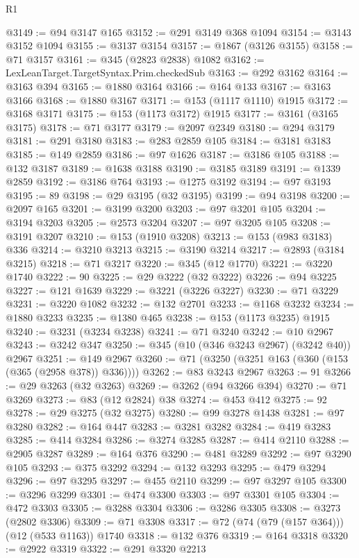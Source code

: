 \begin{lexlean}{R1}
\begin{coremodule}
{{{{{{{{{{{{{{{{{{{{{{{{{{{{{{{{{{{{{{{{{{{{{{{{{{{{{{{{{{{{{{{{{{{{{{{{{{{{{{{{{{{{{{{{{{{{{{{{{{{{{{{{{{{{{{{{{{{{{{{{{{{{{{{{{{{{{{{{{{{{{{{{{{{{{{{{{{{{{{{{{{{{{{{{{{{{{{{{{{{{{{{{{{@3149 := @94 @3147 @165
@3152 := @291 @3149 @368 @1094
@3154 := @3143 @3152 @1094
@3155 := @3137 @3154
@3157 := @1867 (@3126 @3155)
@3158 := @71 @3157
@3161 := @345 (@2823 @2838) @1082
@3162 := LexLeanTarget.TargetSyntax.Prim.checkedSub
@3163 := @292 @3162
@3164 := @3163 @394
@3165 := @1880 @3164
@3166 := @164 @133
@3167 := @3163 @3166
@3168 := @1880 @3167
@3171 := @153 (@1117 @1110) @1915
@3172 := @3168 @3171
@3175 := @153 (@1173 @3172) @1915
@3177 := @3161 (@3165 @3175)
@3178 := @71 @3177
@3179 := @2097 @2349
@3180 := @294 @3179
@3181 := @291 @3180
@3183 := @283 @2859 @105
@3184 := @3181 @3183
@3185 := @149 @2859
@3186 := @97 @1626
@3187 := @3186 @105
@3188 := @132 @3187
@3189 := @1638 @3188
@3190 := @3185 @3189
@3191 := @1339 @2859
@3192 := @3186 @764
@3193 := @1275 @3192
@3194 := @97 @3193
@3195 := 89
@3198 := @29 @3195 (@32 @3195)
@3199 := @94 @3198
@3200 := @2097 @165
@3201 := @3199 @3200
@3203 := @97 @3201 @105
@3204 := @3194 @3203
@3205 := @2573 @3204
@3207 := @97 @3205 @105
@3208 := @3191 @3207
@3210 := @153 (@1910 @3208)
@3213 := @153 (@983 @3183) @336
@3214 := @3210 @3213
@3215 := @3190 @3214
@3217 := @2893 (@3184 @3215)
@3218 := @71 @3217
@3220 := @345 (@12 @1770)
@3221 := @3220 @1740
@3222 := 90
@3225 := @29 @3222 (@32 @3222)
@3226 := @94 @3225
@3227 := @121 @1639
@3229 := @3221 (@3226 @3227)
@3230 := @71 @3229
@3231 := @3220 @1082
@3232 := @132 @2701
@3233 := @1168 @3232
@3234 := @1880 @3233
@3235 := @1380 @465
@3238 := @153 (@1173 @3235) @1915
@3240 := @3231 (@3234 @3238)
@3241 := @71 @3240
@3242 := @10 @2967
@3243 := @3242 @347
@3250 := @345 (@10 (@346 @3243 @2967) (@3242 @40)) @2967
@3251 := @149 @2967
@3260 := @71 (@3250 (@3251 @163 (@360 (@153 (@365 (@2958 @378)) @336))))
@3262 := @83 @3243 @2967
@3263 := 91
@3266 := @29 @3263 (@32 @3263)
@3269 := @3262 (@94 @3266 @394)
@3270 := @71 @3269
@3273 := @83 (@12 @2824) @38
@3274 := @453 @412
@3275 := 92
@3278 := @29 @3275 (@32 @3275)
@3280 := @99 @3278 @1438
@3281 := @97 @3280
@3282 := @164 @447
@3283 := @3281 @3282
@3284 := @419 @3283
@3285 := @414 @3284
@3286 := @3274 @3285
@3287 := @414 @2110
@3288 := @2905 @3287
@3289 := @164 @376
@3290 := @481 @3289
@3292 := @97 @3290 @105
@3293 := @375 @3292
@3294 := @132 @3293
@3295 := @479 @3294
@3296 := @97 @3295
@3297 := @455 @2110
@3299 := @97 @3297 @105
@3300 := @3296 @3299
@3301 := @474 @3300
@3303 := @97 @3301 @105
@3304 := @472 @3303
@3305 := @3288 @3304
@3306 := @3286 @3305
@3308 := @3273 (@2802 @3306)
@3309 := @71 @3308
@3317 := @72 (@74 (@79 (@157 @364))) (@12 (@533 @1163)) @1740
@3318 := @132 @376
@3319 := @164 @3318
@3320 := @2922 @3319
@3322 := @291 @3320 @2213
}}}}}}}}}}}}}}}}}}}}}}}}}}}}}}}}}}}}}}}}}}}}}}}}}}}}}}}}}}}}}}}}}}}}}}}}}}}}}}}}}}}}}}}}}}}}}}}}}}}}}}}}}}}}}}}}}}}}}}}}}}}}}}}}}}}}}}}}}}}}}}}}}}}}}}}}}}}}}}}}}}}}}}}}}}}}}}}}}}}}}}}}}}
\end{coremodule}
\end{lexlean}
